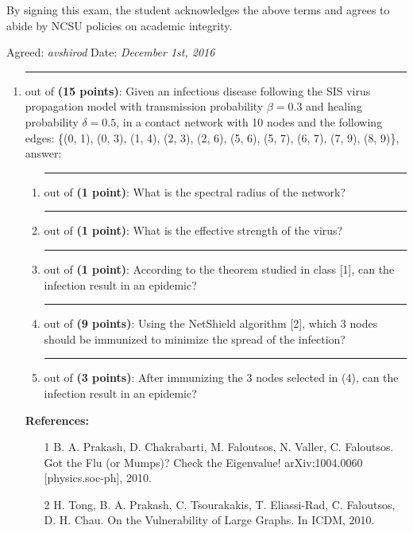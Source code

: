 \documentclass{article}%
\begin{document}
By signing this exam, the student acknowledges the above terms and agrees to abide by NCSU policies on academic integrity.

\bigskip
\noindent Agreed: \textit{avshirod} %
\hspace{\fill} Date: \textit{December 1st, 2016} %


\newpage
\begin{enumerate}

	\item \rule{0.5 in}{1 pt} out of \textbf{(15 points)}: Given an infectious disease following the SIS virus propagation model with transmission probability $\beta=0.3$ and healing probability $\delta=0.5$, in a contact network with 10 nodes and the following edges: \{(0, 1), (0, 3), (1, 4), (2, 3), (2, 6), (5, 6), (5, 7), (6, 7), (7, 9), (8, 9)\}, answer:
	\begin{enumerate}
	\item \rule{0.5 in}{1 pt} out of \textbf{(1 point)}: What is the spectral radius of the network?
	\item \rule{0.5 in}{1 pt} out of \textbf{(1 point)}: What is the effective strength of the virus?
	\item \rule{0.5 in}{1 pt} out of \textbf{(1 point)}: According to the theorem studied in class [1], can the infection result in an epidemic?
	\item \rule{0.5 in}{1 pt} out of \textbf{(9 points)}: Using the NetShield algorithm [2], which 3 nodes should be immunized to minimize the spread of the infection?
	\item \rule{0.5 in}{1 pt} out of \textbf{(3 points)}: After immunizing the 3 nodes selected in (4), can the infection result in an epidemic?
	\end{enumerate}
	
\textbf{References:}	
\begin{itemize}
	\item [1] B. A. Prakash, D. Chakrabarti, M. Faloutsos, N. Valler, C. Faloutsos. Got the Flu (or Mumps)? Check the Eigenvalue! arXiv:1004.0060 [physics.soc-ph], 2010.
	\item [2] H. Tong, B. A. Prakash, C. Tsourakakis, T. Eliassi-Rad, C. Faloutsos, D. H. Chau. On the Vulnerability of Large Graphs. In ICDM, 2010.
\end{itemize}



\end{enumerate}
\end{document}

